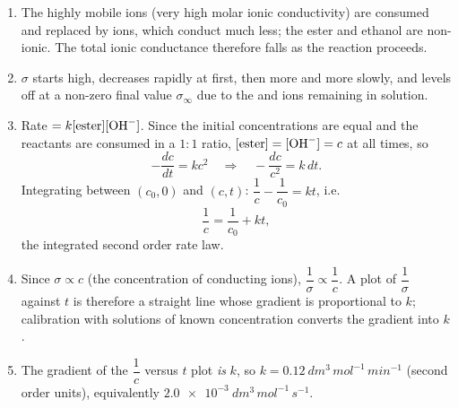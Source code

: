 \documentclass[11pt]{article}
\begin{document}
\begin{corrige}
\begin{enumerate}
\item The highly mobile  ions (very high molar ionic conductivity) are consumed and replaced by  ions, which conduct much less; the ester and ethanol are non-ionic. The total ionic conductance therefore falls as the reaction proceeds.
\item $\sigma$ starts high, decreases rapidly at first, then more and more slowly, and levels off at a non-zero final value $\sigma_{\infty}$ due to the  and  ions remaining in solution.
\item Rate $= k[\text{ester}][\ce{OH-}]$. Since the initial concentrations are equal and the reactants are consumed in a $1:1$ ratio, $[\text{ester}] = [\ce{OH-}] = c$ at all times, so
\[ -\frac{dc}{dt} = kc^{2} \quad\Longrightarrow\quad -\frac{dc}{c^{2}} = k\,dt. \]
Integrating between $(c_0, 0)$ and $(c, t)$: $\dfrac{1}{c} - \dfrac{1}{c_0} = kt$, i.e.
\[ \frac{1}{c} = \frac{1}{c_0} + kt, \]
the integrated second order rate law.
\item Since $\sigma \propto c$ (the concentration of conducting ions), $\dfrac{1}{\sigma} \propto \dfrac{1}{c}$. A plot of $\dfrac{1}{\sigma}$ against $t$ is therefore a straight line whose gradient is proportional to $k$; calibration with solutions of known concentration converts the gradient into $k$.
\item The gradient of the $\dfrac{1}{c}$ versus $t$ plot \emph{is} $k$, so $k = \SI{0.12}{dm^{3}\,mol^{-1}\,min^{-1}}$ (second order units), equivalently $\SI{2.0e-3}{dm^{3}\,mol^{-1}\,s^{-1}}$.
\end{enumerate}
\end{corrige}
\end{document}
